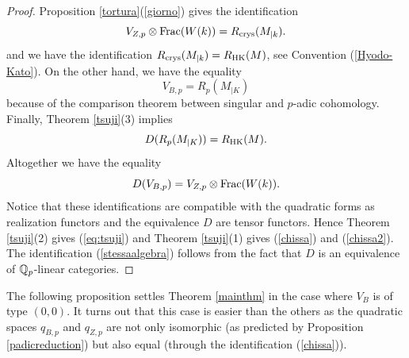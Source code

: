 \documentclass[11pt]{amsart}
\begin{document}
\begin{proof}
 Proposition \ref{tortura}(\ref{giorno}) gives the identification
\[  V_{Z,p}\otimes \mathrm{Frac}(W(k)) =  R_{\textnormal{crys}} (M_{\vert k}).\]
and we have the identification $R_{\textnormal{crys}} (M_{\vert k})= R_{\mathrm{HK}} (M)$, see Convention (\ref{Hyodo-Kato}).
On the other hand, we have the equality
\[V_{B,p}  =  R_p (M_{\vert K})\]
because of the comparison theorem between singular and $p$-adic cohomology.
Finally, Theorem \ref{tsuji}(3) implies
\[ D(R_p (M_{\vert K}))   =   R_{\mathrm{HK}} (M).\]
Altogether we have the equality
\[D(V_{B,p}) = V_{Z,p}\otimes \mathrm{Frac}(W(k)).\]
Notice that these identifications are compatible with the quadratic forms as realization functors and the equivalence $D$ are tensor functors.
Hence Theorem \ref{tsuji}(2) gives  (\ref{eq:tsuji}) and Theorem \ref{tsuji}(1) gives  (\ref{chissa}) and   (\ref{chissa2}).
The identification (\ref{stessaalgebra}) follows from the fact that $D$ is an equivalence of $\mathbb{Q}_p$-linear categories.
\end{proof}

The following proposition settles Theorem \ref{mainthm} in the case where $V_B$ is of type $(0,0)$. It turns out that this case is easier than the others as the quadratic spaces $q_{B,p}$ and $q_{Z,p}$ are not only isomorphic (as predicted by Proposition  \ref{padicreduction}) but also equal (through the identification (\ref{chissa})).
\end{document}
